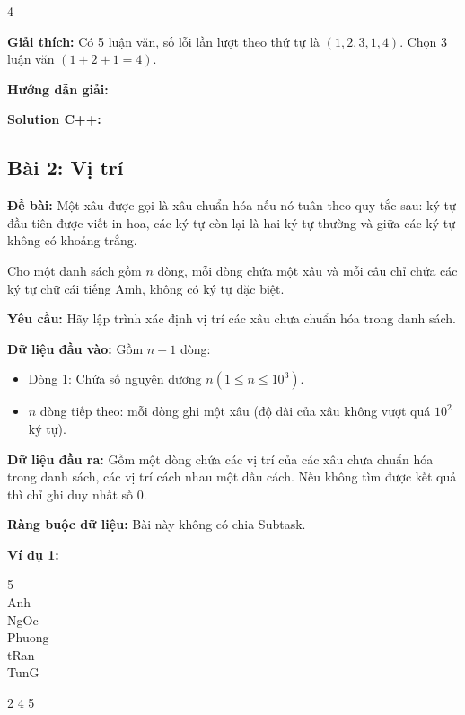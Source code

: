 \documentclass[12pt]{scrartcl}  %
\begin{document}
\begin{tcolorbox}[colback=gray!5!white, colframe=green!50!black, title=Output]
4
\end{tcolorbox}

\textbf{Giải thích:}
Có 5 luận văn, số lỗi lần lượt theo thứ tự là $(1, 2, 3, 1, 4)$. Chọn 3 luận văn $(1 + 2 + 1 = 4)$.

\textbf{Hướng dẫn giải:}

\textbf{Solution C++:}

\subsection{Bài 2: Vị trí}

\textbf{Đề bài:}
Một xâu được gọi là xâu chuẩn hóa nếu nó tuân theo quy tắc sau: ký tự đầu tiên được viết in hoa, các ký tự còn lại là hai ký tự thường và giữa các ký tự không có khoảng trắng. 

Cho một danh sách gồm $n$ dòng, mỗi dòng chứa một xâu và mỗi câu chỉ chứa các ký tự chữ cái tiếng Amh, không có ký tự đặc biệt.

\textbf{Yêu cầu:}
Hãy lập trình xác định vị trí các xâu chưa chuẩn hóa trong danh sách. 

\textbf{Dữ liệu đầu vào:}
Gồm $n + 1$ dòng:
\begin{itemize}
    \item Dòng 1: Chứa số nguyên dương $n (1 \leq n \leq 10^3)$.
    \item $n$ dòng tiếp theo: mỗi dòng ghi một xâu (độ dài của xâu không vượt quá $10^2$ ký tự).
\end{itemize}

\textbf{Dữ liệu đầu ra:}
Gồm một dòng chứa các vị trí của các xâu chưa chuẩn hóa trong danh sách, các vị trí cách nhau một dấu cách. Nếu không tìm được kết quả thì chỉ ghi duy nhất số $0$.

\textbf{Ràng buộc dữ liệu:}
Bài này không có chia Subtask.

\textbf{Ví dụ 1:}
\begin{tcolorbox}[colback=gray!5!white, colframe=blue!50!black, title=Input]
5\\
Anh\\
NgOc\\
Phuong\\
tRan\\
TunG
\end{tcolorbox}

\begin{tcolorbox}[colback=gray!5!white, colframe=green!50!black, title=Output]
2 4 5
\end{tcolorbox}
\end{document}

